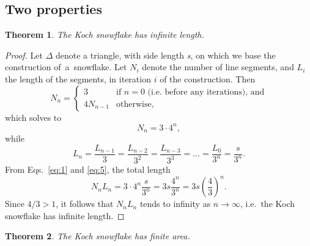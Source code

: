 \documentclass[12pt,a4paper]{article}
\newtheorem{theorem}{Theorem}
\begin{document}
	\subsection{Two properties}
	\begin{theorem}
	 	\textit{The Koch snowflake has infinite length.}
	\end{theorem}
	\begin{proof}
		Let $\Delta$  denote a triangle, with side length \textit{s}, on which we base the construction 
		of~a~snowflake. Let $N_i$ denote the number of line segments, and  $L_i$ the length of the
		segments, in iteration $i$ of the construction. Then    	
		\begin{displaymath}
			  N_n =
			    \begin{cases}
			      3             & \text{if $n=0$ (i.e.\ before any iterations), and} \\
			     4 N_{n-1}		& \text{otherwise,}
			    \end{cases}
		\end{displaymath}
		which solves to 
		\begin{equation}
		 	\label{eq:1}
		  	 N_n=3\cdot 4^n,
		\end{equation}
		while  
		\begin{equation}
		  \label{eq:5}
		   L_n=\frac{L_{n-1}}{3}=\frac{L_{n-2}}{3^2}=\frac{L_{n-3}}{3^3}=\ldots=\frac{L_0}{3^n}=\frac{s}{3^n}.
		\end{equation}
		From Eqs.~\ref{eq:1} and \ref{eq:5}, the total length 
		\begin{displaymath} 
			  N_nL_n=3\cdot4^n\frac{s}{3^n}=3s\frac{4^n}{3^n}=3s\left(\frac{4}{3}\right)^n.
		\end{displaymath}	
		Since $4/3>1$, it follows that $N_n L_n$ tends to infinity as $n \to \infty$, i.e.\ the Koch snowflake has infinite length.
	\end{proof}
	\begin{theorem}
	The Koch snowflake has finite area.
	\end{theorem}
\end{document}
